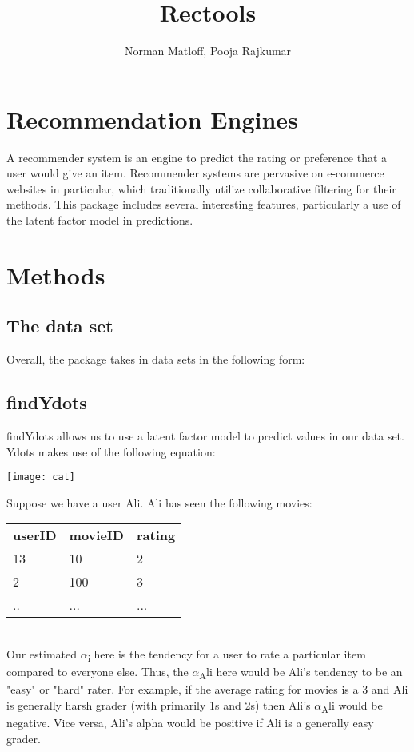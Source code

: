 \documentclass[a4paper,man,natbib]{apa6}
\title{Rectools}
\author{Norman Matloff, Pooja Rajkumar}
\affiliation{University of California, Davis}
\begin{document}
\maketitle

\section{Recommendation Engines}
A recommender system is an engine to predict the rating or preference that a user would give an item. Recommender systems are pervasive on e-commerce websites in particular, which traditionally utilize collaborative filtering for their methods. This package includes several interesting features, particularly a use of the latent factor model in predictions. 

\section{Methods}

\subsection{The data set}
Overall, the package takes in data sets in the following form: 


\subsection{findYdots}

findYdots allows us to use a latent factor model to predict values in our data set. Ydots makes use of the following equation: 

\texttt{[image: cat]}

Suppose we have a user Ali. Ali has seen the following movies: 


\begin{tabular}{l l l}

\textbf{userID} & \textbf{movieID} & \textbf{rating}\\

13 & 10& 2\\
2 & 100 & 3 \\
.. & ... & ... \\
\end{tabular}
\\
Our estimated $\alpha$\textsubscript i here is the tendency for a user to rate a particular item compared to everyone else. Thus, the $\alpha$\textsubscript Ali here would be Ali's tendency to be an "easy" or "hard" rater. For example, if the average rating for movies is a 3 and Ali is generally harsh grader (with primarily 1s and 2s) then Ali's $\alpha$\textsubscript Ali would be negative. Vice versa, Ali's alpha would be positive if Ali is a generally easy grader. 
\end{document}

